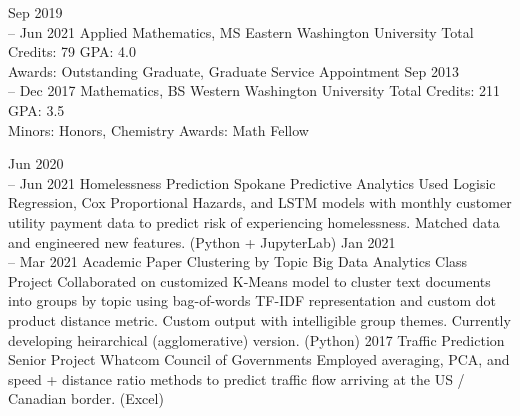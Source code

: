 \documentclass[11pt]{developercv} %
\newcommand{\vsp}{\vspace{-10pt}}
\begin{document}


\begin{entrylist}
	\entry
		{Sep 2019\\
		-- Jun 2021}
		{Applied Mathematics, MS}
		{Eastern Washington University}
		{Total Credits: 79 \hspace{103pt} GPA: 4.0 \\
		Awards: Outstanding Graduate, Graduate Service Appointment
		}
	\entry
		{Sep 2013\\
		-- Dec 2017}
		{Mathematics, BS}
		{Western Washington University}
		{Total Credits: 211 \hspace{100pt} GPA: 3.5 \\
		Minors: Honors, Chemistry
		Awards: Math Fellow
		}
\end{entrylist}

\vsp



\begin{entrylist}
	\entry
	    {Jun 2020 \\
		-- Jun 2021}
	    {Homelessness Prediction}
	    {Spokane Predictive Analytics}
	    {Used Logisic Regression, Cox Proportional Hazards, and LSTM models with monthly customer utility payment data to predict risk of experiencing homelessness. Matched data and engineered new features. (Python + JupyterLab)}
	\entry
		{Jan 2021 \\
		-- Mar 2021}
		{Academic Paper Clustering by Topic}
		{Big Data Analytics Class Project}
		{Collaborated on customized K-Means model to cluster text documents into groups by topic using bag-of-words TF-IDF representation and custom dot product distance metric. Custom output with intelligible group themes. Currently developing heirarchical (agglomerative) version. (Python)}
	\entry
		{2017}
		{Traffic Prediction Senior Project}
		{Whatcom Council of Governments}
		{Employed averaging, PCA, and speed + distance ratio methods to predict traffic flow arriving at the US / Canadian border. (Excel)}
\end{entrylist}
\end{document}
